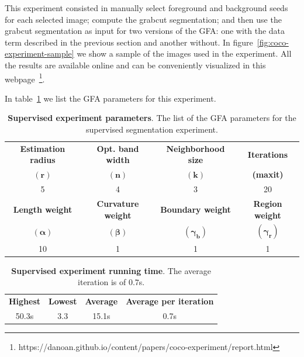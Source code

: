 \documentclass[smallextended]{svjour3}
\begin{document}
This experiment consisted in manually select foreground and background seeds for each selected image; compute the grabcut segmentation; and then use the grabcut segmentation as input for two versions of the GFA: one with the data term described in the previous section and another without. In figure~\ref{fig:coco-experiment-sample} we show a sample of the images used in the experiment. All the results are available online and can be conveniently visualized in this webpage~\footnote{https://danoan.github.io/content/papers/coco-experiment/report.html}. 

In table~\ref{tab:coco-experiment-parameter} we list the GFA parameters for this experiment.

\begin{table}
\center
\begin{tabular}{cccc}
\textbf{Estimation radius} & \textbf{Opt. band width} & \textbf{Neighborhood size} & \textbf{Iterations} \\
$\mathbf{(r)}$ & $\mathbf{(n)}$ & $\mathbf{(k)}$ & \textbf{(maxit)}\\
5 & 4 & 3 & 20\\[1em]
\textbf{Length weight} & \textbf{Curvature weight} & \textbf{Boundary weight} & \textbf{Region weight}\\
$\boldsymbol{(\alpha)}$ & $\boldsymbol{(\beta)}$ & $\boldsymbol{(\gamma_b)}$ & $\boldsymbol{(\gamma_r)}$\\
10 & 1 & 1 & 1
\end{tabular}
\caption{\textbf{Supervised experiment parameters}. The list of the GFA parameters for the supervised segmentation experiment.}
\label{tab:coco-experiment-parameter}
\end{table}
%
%
\begin{table}
\center
\begin{tabular}{cccc}
\textbf{Highest} & \textbf{Lowest} & \textbf{Average} & \textbf{Average per iteration} \\
50.3s & 3.3 & 15.1s & 0.7s\\
\end{tabular}
\caption{\textbf{Supervised experiment running time}. The average iteration is of $0.7$s.}
\label{tab:coco-experiment-running-time}
\end{table}
%
%
\end{document}
